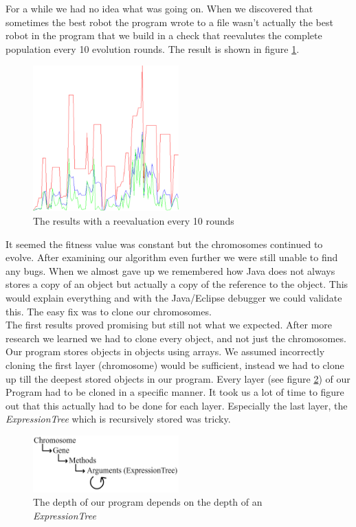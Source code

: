 \documentclass[a4paper,10pt]{article}
\begin{document}
For a while we had no idea what was going on. When we discovered that sometimes the best robot the program wrote to a file wasn't actually the best robot in the program
that we build in a check that reevalutes the complete population every 10 evolution rounds. The result is shown in figure \ref{fig:result_2}.

\begin{figure}[h!]
    \centering
    \includegraphics[width=0.5\textwidth]{result_2}
    \caption{The results with a reevaluation every 10 rounds}
    \label{fig:result_2}
\end{figure}

It seemed the fitness value was constant but the chromosomes continued to evolve. After examining our algorithm even further we were still unable to find any bugs. 
When we almost gave up we remembered how Java does not always stores a copy of an object but actually a copy of the reference to the object. This would explain 
everything and with the Java/Eclipse debugger we could validate this. The easy fix was to clone our chromosomes. \\

The first results proved promising but still not what we expected. After more research we learned we had to clone every object, and not just the chromosomes. Our program
stores objects in objects using arrays. We assumed incorrectly cloning the first layer (chromosome) would be sufficient, instead we had to clone up till the deepest 
stored objects in our program. Every layer (see figure \ref{fig:layers}) of our Program had to be cloned in a specific manner. It took us a lot of time to figure out that
 this actually had to be done for each layer. Especially the last layer, the \textit{ExpressionTree} which is recursively stored was tricky. \\

\begin{figure}[h!]
    \centering
    \includegraphics[width=0.5\textwidth]{layers}
    \caption{The depth of our program depends on the depth of an \textit{ExpressionTree}}
    \label{fig:layers}
\end{figure} 
\end{document}
